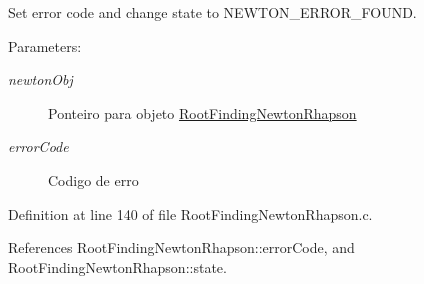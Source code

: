 Set error code and change state to NEWTON\_\-ERROR\_\-FOUND. 

\begin{Desc}
\item[Parameters:]
\begin{description}
\item[{\em newtonObj}]Ponteiro para objeto \hyperlink{structRootFindingNewtonRhapson}{RootFindingNewtonRhapson} \item[{\em errorCode}]Codigo de erro \end{description}
\end{Desc}


Definition at line 140 of file RootFindingNewtonRhapson.c.

References RootFindingNewtonRhapson::errorCode, and RootFindingNewtonRhapson::state.
